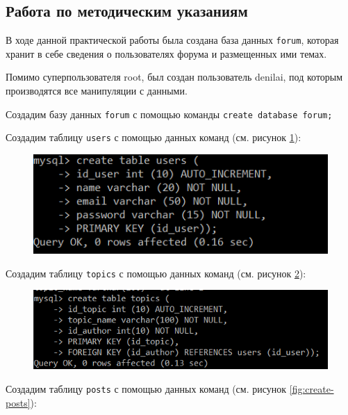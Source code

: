 \documentclass[a4paper,14pt]{extarticle}
\newcommand{\methodsection}{Работа по методическим указаниям}
\begin{document}
\subsection{\methodsection}
В ходе данной практической работы была создана база данных \texttt{forum}, которая хранит в себе сведения о пользователях форума и размещенных ими темах.

Помимо суперпользователя root, был создан пользователь denilai, под которым производятся все манипуляции с данными.

Создадим базу данных \texttt{forum} с помощью команды \texttt{create database forum;}


Создадим таблицу \texttt{users} с помощью данных команд (см. рисунок \ref{fig:create-users}):

\begin{figure}[h!]
	\centering
	\includegraphics[width=0.6\linewidth]{images/create-users}
	\caption{}
	\label{fig:create-users}
\end{figure}


Создадим таблицу \texttt{topics} с помощью данных команд (см. рисунок \ref{fig:create-topics}):

\begin{figure}[h!]
	\centering
	\includegraphics[width=0.6\linewidth]{images/create-topics}
	\caption{}
	\label{fig:create-topics}
\end{figure}

Создадим таблицу \texttt{posts} с помощью данных команд (см. рисунок \ref{fig:create-posts}):
\end{document}
